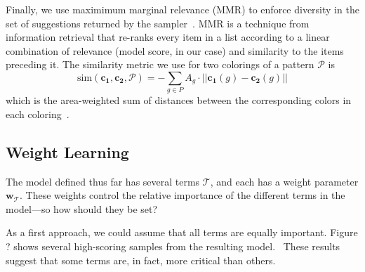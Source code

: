 Finally, we use maximimum marginal relevance (MMR) to enforce diversity in the set of suggestions returned by the sampler~\cite{MMR}. MMR is a technique from information retrieval that re-ranks every item in a list according to a linear combination of relevance (model score, in our case) and similarity to the items preceding it. The similarity metric we use for two colorings of a pattern $\mathcal{P}$ is
\begin{equation*}
\text{sim}(\mathbf{c_1}, \mathbf{c_2}, \mathcal{P}) = - \sum_{g \in P} {A_g \cdot ||\mathbf{c_1}(g) - \mathbf{c_2}(g)||}
\end{equation*}
which is the area-weighted sum of \lab distances between the corresponding colors in each coloring~.

\subsection{Weight Learning}
\label{sec:weights}

\newcommand{\pattern}{\mathcal{P}}
\newcommand{\model}{\mathcal{M}}
\newcommand{\template}{\mathcal{T}}
\newcommand{\weights}{\mathbf{w}}
\newcommand{\dataset}{\mathcal{D}}
\newcommand{\factor}{\mathcal{F}}
\newcommand{\variable}[1]{\mathbf{#1}}
\newcommand{\stats}[3]{\phi_{#1}(#2,#3)}
\newcommand{\expectation}{\mathds{E}}


The model defined thus far has several terms $\template$, and each has a weight parameter $\weights_\template$. These weights control the relative importance of the different terms in the model---so how should they be set?

As a first approach, we could assume that all terms are equally important. Figure ? shows several high-scoring samples from the resulting model.~ These results suggest that some terms are, in fact, more critical than others.

